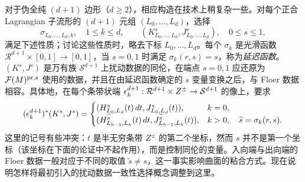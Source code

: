 对于伪全纯 $(d+1)$ 边形（$d\geq2$），相应构造在技术上稍复杂一些。对每个正合 Lagrangian 子流形的 $(d+1)$ 元组 $(L_0,\ldots,L_d)$，选择
\begin{equation}\label{eq:10.13}
\sigma_{L_0,\ldots,L_d,k},\quad1\leq k\leq d,\qquad
(K^s_{L_0,\ldots,L_d},J^s_{L_0,\ldots,L_d}),\quad0\leq s\leq1,
\end{equation}
满足下述性质；讨论这些性质时，略去下标 $L_0,\ldots,L_d$。每个 $\sigma_k$ 是光滑函数 $\mathcal R^{d+1}\times[0,1]\to[0,1]$，当 $s=0,1$ 时满足 $\sigma_k(r,s)=s$，称为\emph{延迟函数}。$(K^s,J^s)$ 是万有族 $\mathcal S^{d+1}$ 上扰动数据的同伦，在端点 $s=0,1$ 应还原为 $\mathcal F(M)^{\mathrm{pr},s}$ 使用的数据，并且在由延迟函数确定的 $s$ 变量变换之后，与 Floer 数据相容。具体地，在每个条带状端 $\epsilon_k^{d+1}:\mathcal R^{d+1}\times Z^\pm\to\mathcal S^{d+1}$ 的像上，要求
\begin{equation}\label{eq:10.14}
(\epsilon_k^{d+1})^*(K^s,J^s)=
\begin{cases}
(H^s_{L_0,L_d}(t)\,dt,J^s_{L_0,L_d}(t)),&k=0,\\
(H^{\widetilde s}_{L_{k-1},L_k}(t)\,dt,J^{\widetilde s}_{L_{k-1},L_k}(t)),
&k>0,\quad\widetilde s=\sigma_k(r,s).
\end{cases}
\end{equation}
这里的记号有些冲突：$t$ 是半无穷条带 $Z^\pm$ 的第二个坐标，然而 $s$ 并不是第一个坐标（该坐标在下面的论证中不起作用），而是控制同伦的变量。入向端与出向端的 Floer 数据一般对应于不同的取值 $\widetilde s\ne s$，这一事实影响曲面的粘合方式。现在说明怎样将最初引入的扰动数据一致性选择概念调整到这里。

